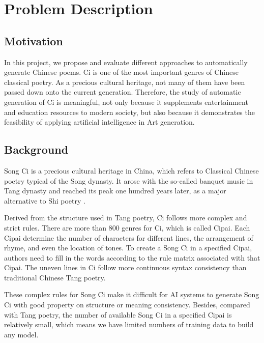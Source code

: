 \section{Problem Description}
\subsection{Motivation}
%
In this project, we propose and evaluate different approaches to automatically generate Chinese poems.
% 
Ci is one of the most important genres of Chinese classical poetry.  
%
As a precious cultural heritage, not many of them have been passed down onto the current generation.
%
Therefore, the study of automatic generation of Ci is meaningful, not only because it supplements entertainment and education resources to modern society, but also because it demonstrates the feasibility of applying artificial intelligence in Art generation.
%

\subsection{Background}
Song Ci is a precious cultural heritage in China, which refers to Classical Chinese poetry typical of the Song dynasty.
%
It arose with the so-called banquet music in Tang dynasty and reached its peak one hundred years later, as a major alternative to Shi poetry\cite{cai2008chinesepoetry} .


Derived from the structure used in Tang poetry, Ci follows more complex and strict rules.
%
There are more than 800 genres for Ci, which is called Cipai\cite{wikici}.
%
Each Cipai determine the number of characters for different lines, the arrangement of rhyme, and even the location of tones.
%
To create a Song Ci in a specified Cipai, authors need to fill in the words according to the rule matrix associated with that Cipai.
 The uneven lines in Ci follow more continuous syntax consistency than traditional Chinese Tang poetry\cite{cai2008chinesepoetry}.

These complex rules for Song Ci make it difficult for AI systems to generate Song Ci with good property on structure or meaning consistency.
%
Besides, compared with Tang poetry, the number of available Song Ci in a specified Cipai is relatively small, which means we have limited numbers of training data to build any model.


